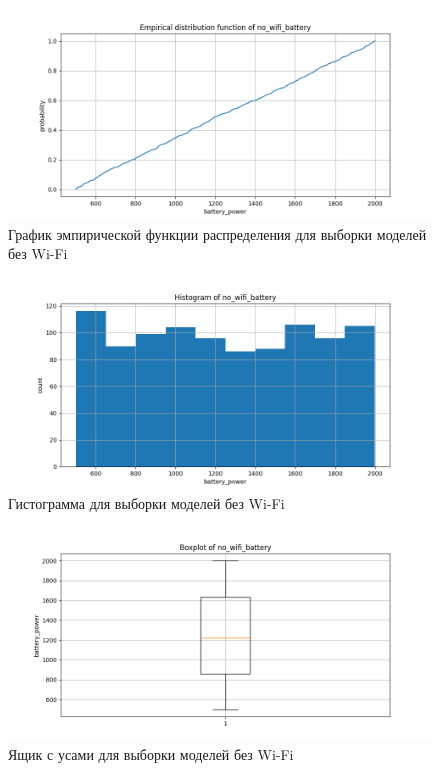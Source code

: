 \documentclass[a4paper, 12pt]{article}
\begin{document}
    \begin{figure}[H]
        \centering
        \includegraphics[scale=0.55]{no_wifi_battery_edf.png}
        \captionsetup{skip=0pt}
        \caption{График эмпирической функции распределения для выборки моделей без Wi-Fi}
        \label{fig:nowifibedf}
    \end{figure}
    \begin{figure}[H]
        \centering
        \includegraphics[scale=0.55]{no_wifi_battery_hist.png}
        \captionsetup{skip=0pt}
        \caption{Гистограмма для выборки моделей без Wi-Fi}
        \label{fig:nowifibhist}
    \end{figure}
    \begin{figure}[H]
        \centering
        \includegraphics[scale=0.55]{no_wifi_battery_box.png}
        \captionsetup{skip=0pt}
        \caption{Ящик с усами для выборки моделей без Wi-Fi}
        \label{fig:nowifibbox}
    \end{figure}
\end{document}
